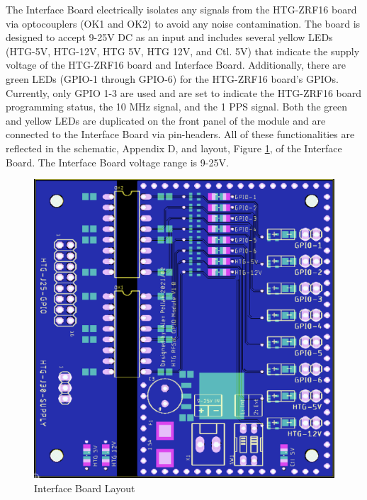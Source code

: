 \documentclass[12pt,a4paper,oneside]{article}
\begin{document}
The Interface Board electrically isolates any signals from the HTG-ZRF16 board via optocouplers (OK1 and OK2) to avoid any noise contamination. The board is designed to accept 9-25V DC as an input and includes several yellow LEDs (HTG-5V, HTG-12V, HTG 5V, HTG 12V, and Ctl. 5V) that indicate the supply voltage of the HTG-ZRF16 board and Interface Board. Additionally, there are green LEDs (GPIO-1 through GPIO-6) for the HTG-ZRF16 board's GPIOs. Currently, only GPIO 1-3 are used and are set to indicate the HTG-ZRF16 board programming status, the 10 MHz signal, and the 1 PPS signal. Both the green and yellow LEDs are duplicated on the front panel of the module and are connected to the Interface Board via pin-headers. All of these functionalities are reflected in the schematic, Appendix D, and layout, Figure \ref{fig:Interface_Layout}, of the Interface Board. The Interface Board voltage range is 9-25V.

%
\begin{figure}[H]
\centering
\includegraphics[width=1\linewidth]{figures/Interface_board_layout.png}
\caption{Interface Board Layout}
\label{fig:Interface_Layout}
\end{figure}
%


\end{document}
